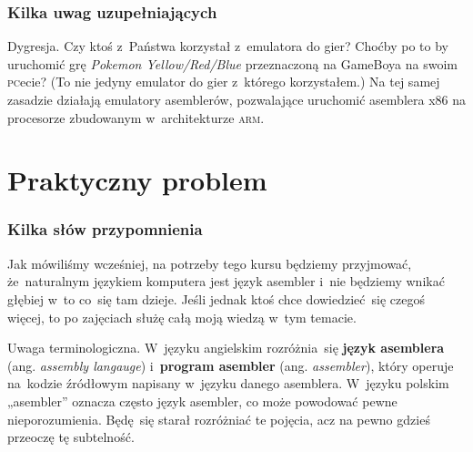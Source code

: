\documentclass[10pt,t]{beamer}
\begin{document}
\begin{frame}
  \frametitle{Kilka uwag uzupełniających}


  \alert{Dygresja.} Czy ktoś z~Państwa korzystał z~emulatora do gier?
  Choćby po to by uruchomić grę \textit{Pokemon Yellow/Red/Blue}
  przeznaczoną na GameBoya na swoim \textsc{pc}ecie? (To nie jedyny
  emulator do gier z~którego korzystałem.) Na tej samej zasadzie działają
  emulatory asemblerów, pozwalające uruchomić asemblera x86 na procesorze
  zbudowanym w~architekturze \textsc{arm}.

\end{frame}















\section{Praktyczny problem}



\begin{frame}
  \frametitle{Kilka słów przypomnienia}


  Jak mówiliśmy wcześniej, na potrzeby tego kursu będziemy przyjmować,
  że~naturalnym językiem komputera jest język asembler i~nie będziemy
  wnikać głębiej w~to co~się tam dzieje. Jeśli jednak ktoś chce
  dowiedzieć~się czegoś więcej, to po zajęciach służę całą moją wiedzą w~tym
  temacie.

  \alert{Uwaga terminologiczna.} W~języku angielskim rozróżnia~się
  \textbf{język asemblera} (ang. \textit{assembly langauge})
  i~\textbf{program asembler} (ang. \textit{assembler}), który operuje
  na~kodzie źródłowym napisany w~języku danego asemblera. W~języku polskim
  „asembler” oznacza często język asembler, co może powodować pewne
  nieporozumienia. Będę~się starał rozróżniać te pojęcia, acz na pewno
  gdzieś przeoczę tę subtelność.

\end{frame}
\end{document}
